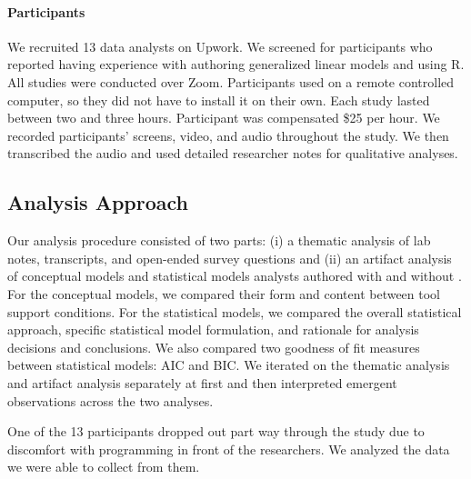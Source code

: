 \noindent \paragraph{Participants} We recruited 13 data analysts on Upwork. We
screened for participants who reported having experience with authoring
generalized linear models and using R.  All studies were conducted over Zoom. Participants used \rTisane
on a remote controlled computer, so they did not have to install it on their
own. Each study lasted between two and three hours. Participant was compensated
\$25 per hour. We recorded participants' screens, video, and audio throughout
the study. We then transcribed the audio and used detailed researcher notes for
qualitative analyses.


\subsection{Analysis Approach}
Our analysis procedure consisted of two parts: (i) a thematic analysis of lab
notes, transcripts, and open-ended survey questions and (ii) an artifact
analysis of conceptual models and statistical models analysts authored with and
without \rTisane. For the conceptual models, we compared their form and content
between tool support conditions. For the statistical models, we compared the
overall statistical approach, specific statistical model formulation, and
rationale for analysis decisions and conclusions. We also compared two goodness
of fit measures between statistical models: AIC and BIC. We iterated on the
thematic analysis and artifact analysis separately at first and then interpreted
emergent observations across the two analyses. 

One of the 13 participants dropped out part way through the study due to
discomfort with programming in front of the researchers. We analyzed the data we
were able to collect from them. 


